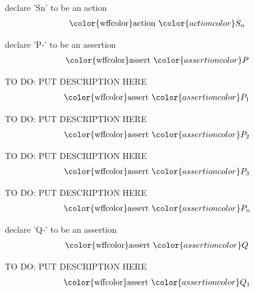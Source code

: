 \begin{lemma} declare 'Sn' to be an action
\begin{align}
{\rm\color{wffcolor}action}~ {\color{actioncolor}S_n}\label{asn}
\end{align}
\end{lemma}

\begin{lemma} declare 'P-' to be an assertion
\begin{align}
{\rm\color{wffcolor}assert}~ {\color{assertioncolor}P}\label{assP}
\end{align}
\end{lemma}

\begin{lemma} TO DO: PUT DESCRIPTION HERE
\begin{align}
{\rm\color{wffcolor}assert}~ {\color{assertioncolor}P_1}\label{assP1}
\end{align}
\end{lemma}

\begin{lemma} TO DO: PUT DESCRIPTION HERE
\begin{align}
{\rm\color{wffcolor}assert}~ {\color{assertioncolor}P_2}\label{assP2}
\end{align}
\end{lemma}

\begin{lemma} TO DO: PUT DESCRIPTION HERE
\begin{align}
{\rm\color{wffcolor}assert}~ {\color{assertioncolor}P_3}\label{assP3}
\end{align}
\end{lemma}

\begin{lemma} TO DO: PUT DESCRIPTION HERE
\begin{align}
{\rm\color{wffcolor}assert}~ {\color{assertioncolor}P_n}\label{assPn}
\end{align}
\end{lemma}

\begin{lemma} declare 'Q-' to be an assertion
\begin{align}
{\rm\color{wffcolor}assert}~ {\color{assertioncolor}Q}\label{assQ}
\end{align}
\end{lemma}

\begin{lemma} TO DO: PUT DESCRIPTION HERE
\begin{align}
{\rm\color{wffcolor}assert}~ {\color{assertioncolor}Q_1}\label{assQ1}
\end{align}
\end{lemma}

